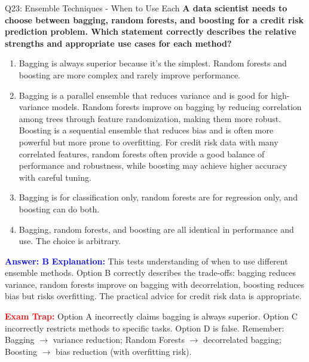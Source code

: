 \documentclass[8pt]{beamer}
\begin{document}
	\begin{frame}{Q23: Ensemble Techniques - When to Use Each}
		\fontsize{6.5}{7.5}\selectfont
		\textbf{A data scientist needs to choose between bagging, random forests, and boosting for a credit risk prediction problem. Which statement correctly describes the relative strengths and appropriate use cases for each method?}
		
		\begin{enumerate}
			\item Bagging is always superior because it's the simplest. Random forests and boosting are more complex and rarely improve performance.
			\item Bagging is a parallel ensemble that reduces variance and is good for high-variance models. Random forests improve on bagging by reducing correlation among trees through feature randomization, making them more robust. Boosting is a sequential ensemble that reduces bias and is often more powerful but more prone to overfitting. For credit risk data with many correlated features, random forests often provide a good balance of performance and robustness, while boosting may achieve higher accuracy with careful tuning.
			\item Bagging is for classification only, random forests are for regression only, and boosting can do both.
			\item Bagging, random forests, and boosting are all identical in performance and use. The choice is arbitrary.
		\end{enumerate}
		
		\vspace{0.1cm}
		\textcolor{blue}{\textbf{Answer: B}}
		\vspace{0.1cm}
		\textcolor{blue}{\textbf{Explanation:}} This tests understanding of when to use different ensemble methods. Option B correctly describes the trade-offs: bagging reduces variance, random forests improve on bagging with decorrelation, boosting reduces bias but risks overfitting. The practical advice for credit risk data is appropriate.
		
		\textcolor{red}{\textbf{Exam Trap:}} Option A incorrectly claims bagging is always superior. Option C incorrectly restricts methods to specific tasks. Option D is false. Remember: Bagging $\rightarrow$ variance reduction; Random Forests $\rightarrow$ decorrelated bagging; Boosting $\rightarrow$ bias reduction (with overfitting risk).
	\end{frame}
	
\end{document}
